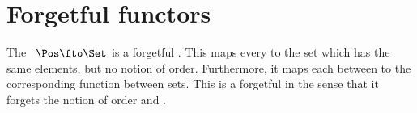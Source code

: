 \section{Forgetful functors}
\label{sec:forgetful-functors}


\begin{example}
    The ~$\Pos \fto \Set$ is a forgetful .
    This  maps every  to the set which has the same elements, but no notion of order.
    Furthermore, it maps each  between  to the corresponding function between sets.
    This is a forgetful  in the sense that it forgets the notion of order and .
\end{example}
